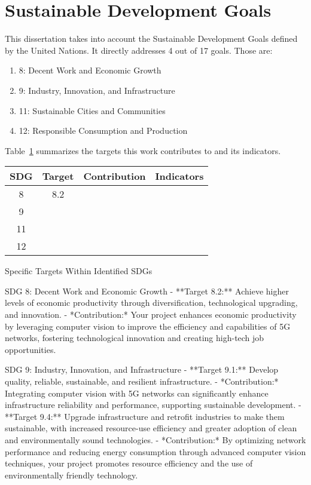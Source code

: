 
\chapter*{Sustainable Development Goals}
This dissertation takes into account the Sustainable Development Goals defined by the United Nations.
It directly addresses 4 out of 17 goals.
Those are:
\begin{enumerate}
    \item 8: Decent Work and Economic Growth
    \item 9: Industry, Innovation, and Infrastructure
    \item 11: Sustainable Cities and Communities
    \item 12: Responsible Consumption and Production
\end{enumerate}
Table~\ref{tab:ODS_table} summarizes the targets this work contributes to and its indicators.


\begin{table}[H]
    \begin{tabular}{|c|c|c|c|}
        \hline
        \textbf{SDG} & \textbf{Target} & \textbf{Contribution} & \textbf{Indicators} \\ \hline
        8            & 8.2         &                       &                     \\ \hline
        9            &               &                       &                     \\ \hline
        11            &               &                       &                     \\ \hline
        12&               &                       &                     \\ \hline
    \end{tabular}\label{tab:ODS_table}
\end{table}


Specific Targets Within Identified SDGs

SDG 8: Decent Work and Economic Growth
- **Target 8.2:** Achieve higher levels of economic productivity through diversification, technological upgrading, and innovation.
- *Contribution:* Your project enhances economic productivity by leveraging computer vision to improve the efficiency and capabilities of 5G networks, fostering technological innovation and creating high-tech job opportunities.

SDG 9: Industry, Innovation, and Infrastructure
- **Target 9.1:** Develop quality, reliable, sustainable, and resilient infrastructure.
- *Contribution:* Integrating computer vision with 5G networks can significantly enhance infrastructure reliability and performance, supporting sustainable development.
- **Target 9.4:** Upgrade infrastructure and retrofit industries to make them sustainable, with increased resource-use efficiency and greater adoption of clean and environmentally sound technologies.
- *Contribution:* By optimizing network performance and reducing energy consumption through advanced computer vision techniques, your project promotes resource efficiency and the use of environmentally friendly technology.

